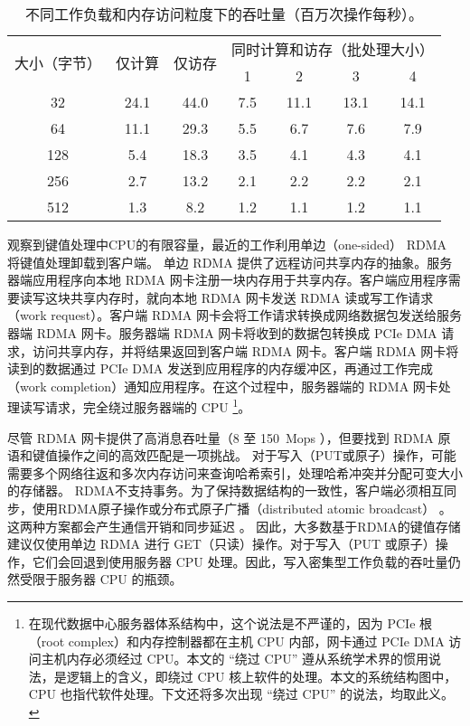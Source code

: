 \begin{table}[htbp]
	\small
	\centering
	\caption{不同工作负载和内存访问粒度下的吞吐量（百万次操作每秒）。}
	\begin{tabular}{|c|c|c|c|c|c|c|}
		\hline
		\multirow{2}{*}{大小（字节）} & \multirow{2}{*}{仅计算} & \multirow{2}{*}{仅访存} & \multicolumn{4}{c|}{同时计算和访存（批处理大小）} \\\cline{4-7} 
		&  & & 1 & 2 & 3 & 4 \\\hline
		32 & 24.1 & 44.0 & 7.5 & 11.1 & 13.1 & 14.1 \\\hline
		64 & 11.1 & 29.3 & 5.5 & 6.7 & 7.6 & 7.9 \\\hline
		128 & 5.4 & 18.3 & 3.5 & 4.1 & 4.3 & 4.1 \\\hline
		256 & 2.7 & 13.2 & 2.1 & 2.2 & 2.2 & 2.1 \\\hline
		512 & 1.3 & 8.2 & 1.2 & 1.1 & 1.2 & 1.1 \\\hline
	\end{tabular}
	\label{kvdirect:tab:kv-cpu-throughput}
\end{table}


观察到键值处理中CPU的有限容量，最近的工作利用单边（one-sided） RDMA 将键值处理卸载到客户端。
单边 RDMA 提供了远程访问共享内存的抽象。服务器端应用程序向本地 RDMA 网卡注册一块内存用于共享内存。客户端应用程序需要读写这块共享内存时，就向本地 RDMA 网卡发送 RDMA 读或写工作请求（work request）。客户端 RDMA 网卡会将工作请求转换成网络数据包发送给服务器端 RDMA 网卡。服务器端 RDMA 网卡将收到的数据包转换成 PCIe DMA 请求，访问共享内存，并将结果返回到客户端 RDMA 网卡。客户端 RDMA 网卡将读到的数据通过 PCIe DMA 发送到应用程序的内存缓冲区，再通过工作完成（work completion）通知应用程序。在这个过程中，服务器端的 RDMA 网卡处理读写请求，完全绕过服务器端的 CPU \footnote{在现代数据中心服务器体系结构中，这个说法是不严谨的，因为 PCIe 根（root complex）和内存控制器都在主机 CPU 内部，网卡通过 PCIe DMA 访问主机内存必须经过 CPU。本文的 ``绕过 CPU'' 遵从系统学术界的惯用说法，是逻辑上的含义，即绕过 CPU 核上软件的处理。本文的系统结构图中，CPU 也指代软件处理。下文还将多次出现 ``绕过 CPU'' 的说法，均取此义。}。

尽管 RDMA 网卡提供了高消息吞吐量（8 至 150~Mops \cite {kalia2016design}），但要找到 RDMA 原语和键值操作之间的高效匹配是一项挑战。
对于写入（PUT或原子）操作，可能需要多个网络往返和多次内存访问来查询哈希索引，处理哈希冲突并分配可变大小的存储器。
RDMA不支持事务。为了保持数据结构的一致性，客户端必须相互同步，使用RDMA原子操作或分布式原子广播（distributed atomic broadcast） \cite{szepesi2014designing}。这两种方案都会产生通信开销和同步延迟 \cite {mitchell2013using,dragojevic2014farm}。
因此，大多数基于RDMA的键值存储 \cite {mitchell2013using,dragojevic2014farm,kalia2014using} 建议仅使用单边 RDMA 进行 GET（只读）操作。对于写入（PUT 或原子）操作，它们会回退到使用服务器 CPU 处理。因此，写入密集型工作负载的吞吐量仍然受限于服务器 CPU 的瓶颈。

